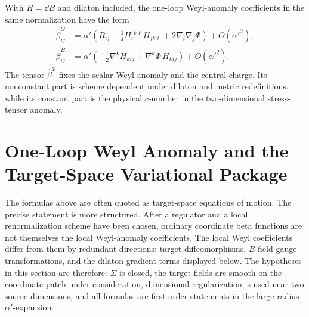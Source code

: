 With \(H=\dd B\) and dilaton included, the one-loop Weyl-anomaly coefficients
in the same normalization have the form
\begin{align}
  \widehat\beta^G_{ij}
  &=
  \alpha'
  \left(
    R_{ij}
    -\frac14 H_i{}^{k\ell}H_{jk\ell}
    +2\nabla_i\nabla_j\Phi
  \right)
  +O(\alpha'^2),
  \label{eq:nlsm-one-loop-hatted-beta-g}
  \\
  \widehat\beta^B_{ij}
  &=
  \alpha'
  \left(
    -\frac12\nabla^kH_{kij}
    +\nabla^k\Phi\,H_{kij}
  \right)
  +O(\alpha'^2).
  \label{eq:nlsm-one-loop-hatted-beta-b}
\end{align}
The tensor \(\widehat\beta^\Phi\) fixes the scalar Weyl anomaly and the
central charge.  Its nonconstant part is scheme dependent under dilaton and
metric redefinitions, while its constant part is the physical \(c\)-number in
the two-dimensional stress-tensor anomaly.

\section{One-Loop Weyl Anomaly and the Target-Space Variational Package}
\label{sec:nlsm-one-loop-weyl-variational-package}

The formulas above are often quoted as target-space equations of motion.  The
precise statement is more structured.  After a regulator and a local
renormalization scheme have been chosen, ordinary coordinate beta functions
are not themselves the local Weyl-anomaly coefficients.  The local Weyl
coefficients differ from them by redundant directions: target
diffeomorphisms, \(B\)-field gauge transformations, and the dilaton-gradient
terms displayed below.  The hypotheses in this section are therefore:
\(\Sigma\) is closed, the target fields are smooth on the coordinate patch
under consideration, dimensional regularization is used near two source
dimensions, and all formulas are first-order statements in the large-radius
\(\alpha'\)-expansion.

